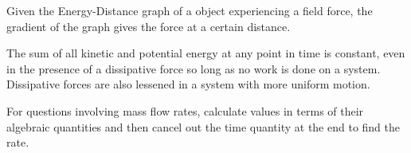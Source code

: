 \documentclass[../main]{subfiles}
\begin{document}
	Given the Energy-Distance graph of a object experiencing a field force, the gradient of the graph gives the force at a certain distance.


	The sum of all kinetic and potential energy at any point in time is constant, even in the presence of a dissipative force so long as no work is done on a system. Dissipative forces are also lessened in a system with more uniform motion.



	For questions involving mass flow rates, calculate values in terms of their algebraic quantities and then cancel out the time quantity at the end to find the rate.
\end{document}
